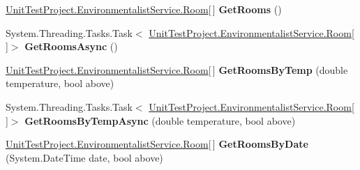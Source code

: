 \begin{DoxyCompactItemize}
\item 
\hypertarget{interface_unit_test_project_1_1_environmentalist_service_1_1_i_service1_ac8e7cf30c78077c111004249908b3a98}{}\hyperlink{class_unit_test_project_1_1_environmentalist_service_1_1_room}{Unit\+Test\+Project.\+Environmentalist\+Service.\+Room}\mbox{[}$\,$\mbox{]} {\bfseries Get\+Rooms} ()\label{interface_unit_test_project_1_1_environmentalist_service_1_1_i_service1_ac8e7cf30c78077c111004249908b3a98}

\item 
\hypertarget{interface_unit_test_project_1_1_environmentalist_service_1_1_i_service1_ac1e9e64ab63d917de0e9890cb0d116d8}{}System.\+Threading.\+Tasks.\+Task$<$ \hyperlink{class_unit_test_project_1_1_environmentalist_service_1_1_room}{Unit\+Test\+Project.\+Environmentalist\+Service.\+Room}\mbox{[}$\,$\mbox{]}$>$ {\bfseries Get\+Rooms\+Async} ()\label{interface_unit_test_project_1_1_environmentalist_service_1_1_i_service1_ac1e9e64ab63d917de0e9890cb0d116d8}

\item 
\hypertarget{interface_unit_test_project_1_1_environmentalist_service_1_1_i_service1_ac6d7bf15854e704f4ef2906c3e8730c6}{}\hyperlink{class_unit_test_project_1_1_environmentalist_service_1_1_room}{Unit\+Test\+Project.\+Environmentalist\+Service.\+Room}\mbox{[}$\,$\mbox{]} {\bfseries Get\+Rooms\+By\+Temp} (double temperature, bool above)\label{interface_unit_test_project_1_1_environmentalist_service_1_1_i_service1_ac6d7bf15854e704f4ef2906c3e8730c6}

\item 
\hypertarget{interface_unit_test_project_1_1_environmentalist_service_1_1_i_service1_ad982970c69cee084826ece63e022d7a2}{}System.\+Threading.\+Tasks.\+Task$<$ \hyperlink{class_unit_test_project_1_1_environmentalist_service_1_1_room}{Unit\+Test\+Project.\+Environmentalist\+Service.\+Room}\mbox{[}$\,$\mbox{]}$>$ {\bfseries Get\+Rooms\+By\+Temp\+Async} (double temperature, bool above)\label{interface_unit_test_project_1_1_environmentalist_service_1_1_i_service1_ad982970c69cee084826ece63e022d7a2}

\item 
\hypertarget{interface_unit_test_project_1_1_environmentalist_service_1_1_i_service1_a4482f9a141fb629fec20db2b77d2caea}{}\hyperlink{class_unit_test_project_1_1_environmentalist_service_1_1_room}{Unit\+Test\+Project.\+Environmentalist\+Service.\+Room}\mbox{[}$\,$\mbox{]} {\bfseries Get\+Rooms\+By\+Date} (System.\+Date\+Time date, bool above)\label{interface_unit_test_project_1_1_environmentalist_service_1_1_i_service1_a4482f9a141fb629fec20db2b77d2caea}


\end{DoxyCompactItemize}
